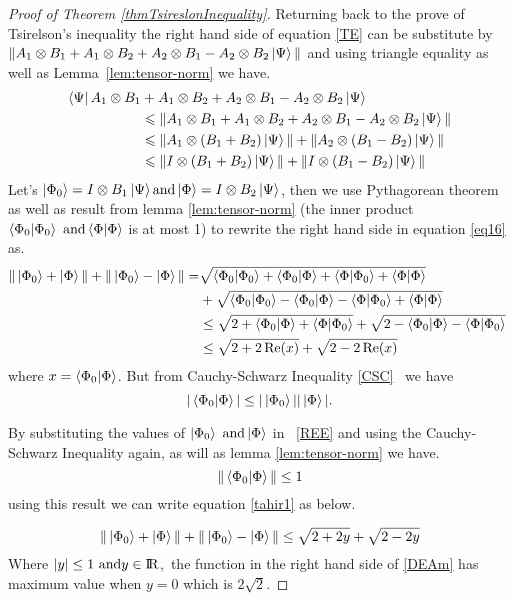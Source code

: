 \begin{proof}[Proof of Theorem \ref{thmTsireslonInequality}]
Returning back to the prove of  Tsirelson’s inequality the right hand side of equation \ref{TE}  can be substitute by $\| A_1\otimes B_1+ A_1\otimes B_2+A_2\otimes B_1 -A_2\otimes B_2\ket{\Psi}\|$ and  using   triangle equality as well as Lemma~\ref{lem:tensor-norm} we have.
\begin{align}
\bra{\Psi}A_1\otimes B_1 &+ A_1\otimes B_2+A_2\otimes B_1 -A_2\otimes B_2\ket{\Psi} \\
&\leqslant  \| A_1\otimes B_1+ A_1\otimes B_2+A_2\otimes B_1 -A_2\otimes B_2\ket{\Psi}\| \nonumber\\
&\leqslant \| A_1\otimes (B_1+ B_2)\ket{\Psi}\| +\| A_2\otimes( B_1 - B_2)\ket{\Psi}\|\nonumber \\
&\leqslant \| I\otimes (B_1+ B_2)\ket{\Psi}\| +\| I\otimes( B_1 - B_2)\ket{\Psi}\|\label{eq16}
\end{align}
Let's $\ket{\Phi_0}=I\otimes B_1\ket{\Psi} \text{and}\ket{\Phi}=I\otimes B_2\ket{\Psi}$, then we  use  Pythagorean theorem as well as result from lemma \ref{lem:tensor-norm} (the inner product $\bra{\Phi_0}\ket{\Phi_0} \text{ and}\bra{\Phi}\ket{\Phi}$  is at most 1) to  rewrite the right hand side in equation \ref{eq16} as.
\begin{align}
\| \ket{\Phi_0}+ \ket{\Phi}\| +\| \ket{\Phi_0}- \ket{\Phi}\| = &\sqrt{\bra{\Phi_0}\ket{\Phi_0}+\bra{\Phi_0}\ket{\Phi}+\bra{\Phi}\ket{\Phi_0}+\bra{\Phi}\ket{\Phi}}\nonumber\\
&+\sqrt{\bra{\Phi_0}\ket{\Phi_0}-\bra{\Phi_0}\ket{\Phi}-\bra{\Phi}\ket{\Phi_0}+\bra{\Phi}\ket{\Phi}}\nonumber\\
 &\leq \sqrt{2+\bra{\Phi_0}\ket{\Phi}+\bra{\Phi}\ket{\Phi_0}}+\sqrt{2-\bra{\Phi_0}\ket{\Phi}-\bra{\Phi}\ket{\Phi_0}}\
\nonumber\\
&\leq \sqrt{2+2\Re(x)}+\sqrt{2-2\Re(x)}\label{tahir1}
\end{align} 
where $x= \bra{\Phi_0}\ket{\Phi}$. But from  Cauchy-Schwarz Inequality \ref{CSC}~ we have 
\begin{equation}\label{REE}
|\bra{\Phi_0}\ket{\Phi}|\leq |\ket{\Phi_0}||\ket{\Phi}|.
\end{equation}


By substituting the values of $\ket{\Phi_0} \text{ and} \ket{\Phi}$ in ~\ref{REE} and using the Cauchy-Schwarz Inequality again, as will as lemma \ref{lem:tensor-norm} we have.
\begin{equation}
\|\bra{\Phi_0}\ket{\Phi}\|\leq 1
\end{equation}
using this result we can write equation \ref{tahir1} as below.

\begin{equation}\label{DEAm}
\| \ket{\Phi_0}+ \ket{\Phi}\| +\| \ket{\Phi_0}- \ket{\Phi}\| \leq \sqrt{2+2y}+\sqrt{2-2y}
\end{equation} 
Where $|y|\leq 1 \text{ and} y\in {\rm I\!R}$,~the function  in the right hand side of \ref{DEAm} has maximum value  when $y=0$ which is $2\sqrt{2}$.

\end{proof}


